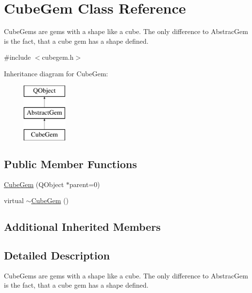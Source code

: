 \hypertarget{class_cube_gem}{\section{Cube\+Gem Class Reference}
\label{class_cube_gem}
}


Cube\+Gems are gems with a shape like a cube. The only difference to Abstrac\+Gem is the fact, that a cube gem has a shape defined.  




{\ttfamily \#include $<$cubegem.\+h$>$}

Inheritance diagram for Cube\+Gem\+:\begin{figure}[H]
\begin{center}
\leavevmode
\includegraphics[height=3.000000cm]{class_cube_gem}
\end{center}
\end{figure}
\subsection*{Public Member Functions}
\begin{DoxyCompactItemize}
\item 
\hyperlink{class_cube_gem_a049ed1f21d75e2876cbbc69c56db93c2}{Cube\+Gem} (Q\+Object $\ast$parent=0)
\item 
virtual \hyperlink{class_cube_gem_a6df1dd2ab158e5a0c7bead41d0668140}{$\sim$\+Cube\+Gem} ()
\end{DoxyCompactItemize}
\subsection*{Additional Inherited Members}


\subsection{Detailed Description}
Cube\+Gems are gems with a shape like a cube. The only difference to Abstrac\+Gem is the fact, that a cube gem has a shape defined. 

